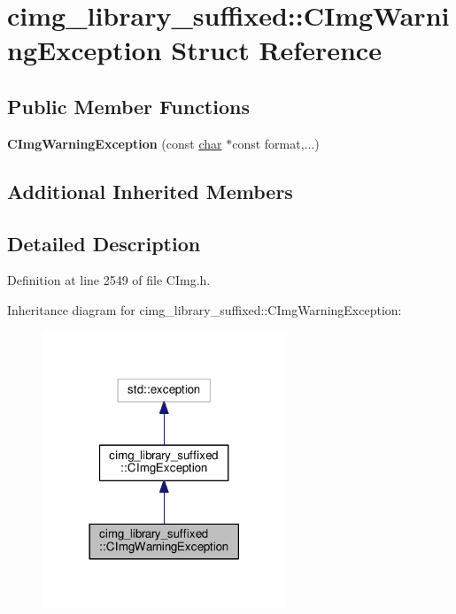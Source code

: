 \hypertarget{structcimg__library__suffixed_1_1CImgWarningException}{}\section{cimg\+\_\+library\+\_\+suffixed\+:\+:C\+Img\+Warning\+Exception Struct Reference}
\label{structcimg__library__suffixed_1_1CImgWarningException}
\subsection*{Public Member Functions}
\begin{DoxyCompactItemize}
\item 
\mbox{\label{structcimg__library__suffixed_1_1CImgWarningException_a8e14e33d236b90bfc20fa39a35bf13e4}} 
{\bfseries C\+Img\+Warning\+Exception} (const \hyperlink{classchar}{char} $\ast$const format,...)
\end{DoxyCompactItemize}
\subsection*{Additional Inherited Members}


\subsection{Detailed Description}


Definition at line 2549 of file C\+Img.\+h.



Inheritance diagram for cimg\+\_\+library\+\_\+suffixed\+:\+:C\+Img\+Warning\+Exception\+:
\nopagebreak
\begin{figure}[H]
\begin{center}
\leavevmode
\includegraphics[width=206pt]{de/d37/structcimg__library__suffixed_1_1CImgWarningException__inherit__graph}
\end{center}
\end{figure}


